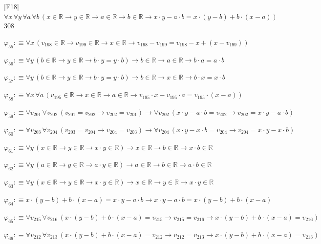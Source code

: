 \begin{fullproof}{[F18]}{$\forall x\,\forall y\,\forall a\,\forall b\,(x \in \mathbb{R} \to y \in \mathbb{R} \to a \in \mathbb{R} \to b \in \mathbb{R} \to x \cdot y - a \cdot b = x \cdot (y - b) + b \cdot (x - a))$}{308}
\begin{abbrevlist}
\item $\varphi_{55} :\equiv \forall x\,(v_{198} \in \mathbb{R} \to v_{199} \in \mathbb{R} \to x \in \mathbb{R} \to v_{198} - v_{199} = v_{198} - x + (x - v_{199}))$
\item $\varphi_{56} :\equiv \forall y\,(b \in \mathbb{R} \to y \in \mathbb{R} \to b \cdot y = y \cdot b) \to b \in \mathbb{R} \to a \in \mathbb{R} \to b \cdot a = a \cdot b$
\item $\varphi_{57} :\equiv \forall y\,(b \in \mathbb{R} \to y \in \mathbb{R} \to b \cdot y = y \cdot b) \to b \in \mathbb{R} \to x \in \mathbb{R} \to b \cdot x = x \cdot b$
\item $\varphi_{58} :\equiv \forall x\,\forall a\,(v_{195} \in \mathbb{R} \to x \in \mathbb{R} \to a \in \mathbb{R} \to v_{195} \cdot x - v_{195} \cdot a = v_{195} \cdot (x - a))$
\item $\varphi_{59} :\equiv \forall v_{201}\,\forall v_{202}\,(v_{201} = v_{202} \to v_{202} = v_{201}) \to \forall v_{202}\,(x \cdot y - a \cdot b = v_{202} \to v_{202} = x \cdot y - a \cdot b)$
\item $\varphi_{60} :\equiv \forall v_{203}\,\forall v_{204}\,(v_{203} = v_{204} \to v_{204} = v_{203}) \to \forall v_{204}\,(x \cdot y - x \cdot b = v_{204} \to v_{204} = x \cdot y - x \cdot b)$
\item $\varphi_{61} :\equiv \forall y\,(x \in \mathbb{R} \to y \in \mathbb{R} \to x \cdot y \in \mathbb{R}) \to x \in \mathbb{R} \to b \in \mathbb{R} \to x \cdot b \in \mathbb{R}$
\item $\varphi_{62} :\equiv \forall y\,(a \in \mathbb{R} \to y \in \mathbb{R} \to a \cdot y \in \mathbb{R}) \to a \in \mathbb{R} \to b \in \mathbb{R} \to a \cdot b \in \mathbb{R}$
\item $\varphi_{63} :\equiv \forall y\,(x \in \mathbb{R} \to y \in \mathbb{R} \to x \cdot y \in \mathbb{R}) \to x \in \mathbb{R} \to y \in \mathbb{R} \to x \cdot y \in \mathbb{R}$
\item $\varphi_{64} :\equiv x \cdot (y - b) + b \cdot (x - a) = x \cdot y - a \cdot b \to x \cdot y - a \cdot b = x \cdot (y - b) + b \cdot (x - a)$
\item $\varphi_{65} :\equiv \forall v_{215}\,\forall v_{216}\,(x \cdot (y - b) + b \cdot (x - a) = v_{215} \to v_{215} = v_{216} \to x \cdot (y - b) + b \cdot (x - a) = v_{216})$
\item $\varphi_{66} :\equiv \forall v_{212}\,\forall v_{213}\,(x \cdot (y - b) + b \cdot (x - a) = v_{212} \to v_{212} = v_{213} \to x \cdot (y - b) + b \cdot (x - a) = v_{213})$

\end{abbrevlist}
\end{fullproof}

